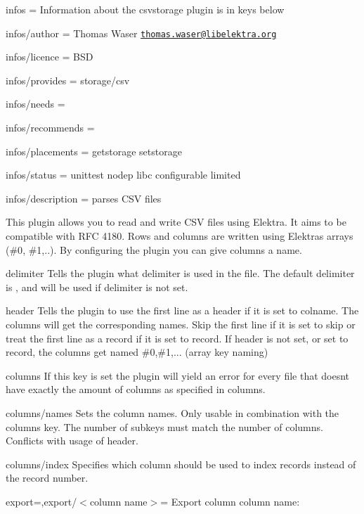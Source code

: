 
\begin{DoxyItemize}
\item infos = Information about the csvstorage plugin is in keys below
\item infos/author = Thomas Waser \href{mailto:thomas.waser@libelektra.org}{\tt thomas.\+waser@libelektra.\+org}
\item infos/licence = B\+SD
\item infos/provides = storage/csv
\item infos/needs =
\item infos/recommends =
\item infos/placements = getstorage setstorage
\item infos/status = unittest nodep libc configurable limited
\item infos/description = parses C\+SV files
\end{DoxyItemize}

This plugin allows you to read and write C\+SV files using Elektra. It aims to be compatible with R\+FC 4180. Rows and columns are written using Elektra\textquotesingle{}s arrays ({\ttfamily \#0}, {\ttfamily \#1},..). By configuring the plugin you can give columns a name.

{\ttfamily delimiter} Tells the plugin what delimiter is used in the file. The default delimiter is {\ttfamily ,} and will be used if {\ttfamily delimiter} is not set.

{\ttfamily header} Tells the plugin to use the first line as a header if it is set to {\ttfamily colname}. The columns will get the corresponding names. Skip the first line if it is set to {\ttfamily skip} or treat the first line as a record if it is set to {\ttfamily record}. If {\ttfamily header} is not set, or set to {\ttfamily record}, the columns get named \#0,\#1,... (array key naming)

{\ttfamily columns} If this key is set the plugin will yield an error for every file that doesn\textquotesingle{}t have exactly the amount of columns as specified in {\ttfamily columns}.

{\ttfamily columns/names} Sets the column names. Only usable in combination with the {\ttfamily columns} key. The number of subkeys must match the number of columns. Conflicts with usage of {\ttfamily header}.

{\ttfamily columns/index} Specifies which column should be used to index records instead of the record number.

{\ttfamily export=,export/$<$column name$>$=} Export column {\ttfamily column name}\+:


